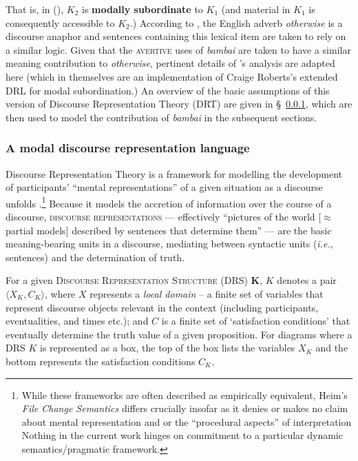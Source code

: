\noindent That is, in (), $ \mathit{K_2} $ is \textbf{modally subordinate} to $ \mathit{K_1} $ (and material in $ \mathit{K_1} $ is consequently accessible to $ \mathit{K_2} $.) According to \citet{PhilKotek}, the English adverb \textit{otherwise} is a discourse anaphor and sentences containing this lexical item are taken to rely on a similar logic. Given that the \textsc{avertive} uses of \textit{bambai} are taken to have a similar meaning contribution to \textit{otherwise}, pertinent details of \citet{PhilKotek}'s analysis are adapted here (which in themselves are an implementation of Craige Roberts's extended DRL for modal subordination.) An overview of the basic assumptions of this version of Discourse Representation Theory (DRT) are given in \S~\ref{sec-MDRL}, which are then used to model the contribution of \textit{bambai} in the subsequent sections.


\subsubsection{A modal discourse representation language}\label{sec-MDRL}

Discourse Representation Theory \citetext{originating simultaneously with \citealt{Kamp1981} and the related system of \citealt{Heim}} is a framework for modelling the development of participants' ``mental representations'' of a given situation as a discourse unfolds \citep[see][]{Geurts}.\footnote{While these frameworks are often described as empirically equivalent, Heim's \textit{File Change Semantics} differs crucially insofar as it denies or makes no claim about mental representation and or the ``procedural aspects'' of interpretation \citetext{\citealp[102]{Kamp1988}, this property also addressed in \citealp[\S~6]{Geurts}.} Nothing in the current work hinges on commitment to a particular dynamic semantics/pragmatic framework.} 
Because it models the accretion of information over the course of a discourse, \textsc{discourse representations} --- effectively ``pictures of the world [$ \approx $ partial models] described by sentences that determine them'' --- are the basic meaning-bearing units in a discourse, mediating between syntactic units (\textit{i.e.}, sentences) and the determination of truth.


For a given \textsc{Discourse Representation Structure} (DRS) $ \boldsymbol K $, $ K $ denotes a pair $ \langle X_K,C_K\rangle $, where $ X $ represents a \textit{local domain} -- a finite set of variables that represent discourse objects relevant in the context (including participants, eventualities, and times etc.); and $ C $ is a finite set of `satisfaction conditions' that eventually determine the truth value of a given proposition. For diagrams where a DRS $ K $ is represented as a box, the top of the box lists the variables $ X_K $ and the bottom represents the satisfaction conditions $ C_K $. 

